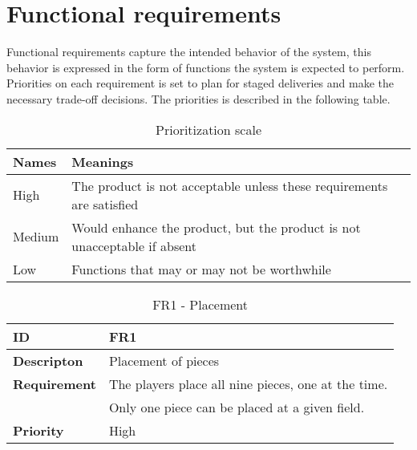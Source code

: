 \newpage
\clearpage

\section{Functional requirements}

Functional requirements capture the intended behavior of the system, this behavior is expressed in the form of functions the system is expected to perform. Priorities on each requirement is set to plan for staged deliveries and make the necessary trade-off decisions. The priorities is described in the following table.

\begin{table}[h!]
\begin{tabular}{ | p{90pt} | p{270pt}  |}
\hline
\bf Names &  \bf Meanings  \\ \hline
High & The product is not acceptable unless these requirements are satisfied \\ \hline 
Medium & Would enhance the product, but the product is not unacceptable if absent  \\ \hline
Low & Functions that may or may not be worthwhile \\ \hline
\end{tabular}

\caption{Prioritization scale}
\end{table}


\begin{table}[h!]
\begin{tabular}{ | p{90pt} | p{270pt}  |}
\hline
\bf ID &  FR1  \\ \hline
\bf Descripton & Placement of pieces \\ \hline 
\bf Requirement & The players place all nine pieces, one at the time.  \\  
& Only one piece can be placed at a given field. \\ \hline
\bf Priority & High \\ \hline
\end{tabular}

\caption{FR1 - Placement}

\end{table}


